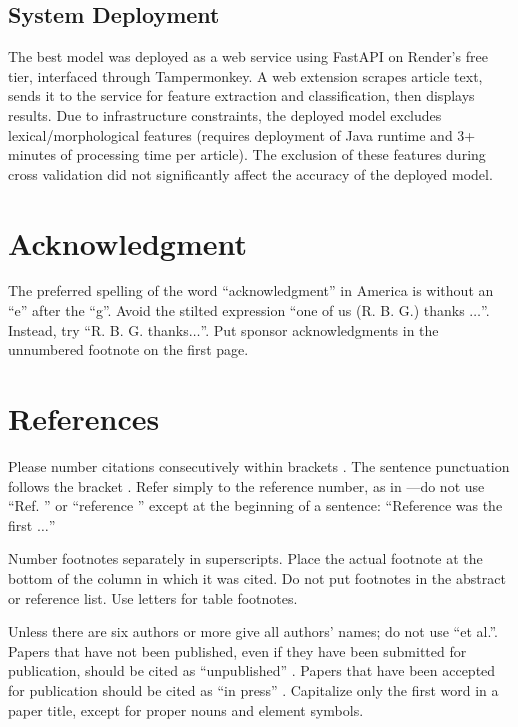 \documentclass[conference]{IEEEtran}
\begin{document}
\subsection{System Deployment}
The best model was deployed as a web service using FastAPI on Render's free tier, interfaced through Tampermonkey. A web extension scrapes article text, sends it to the service for feature extraction and classification, then displays results. Due to infrastructure constraints, the deployed model excludes lexical/morphological features (requires deployment of Java runtime and 3+ minutes of processing time per article). The exclusion of these features during cross validation did not significantly affect the accuracy of the deployed model.

\section*{Acknowledgment}

The preferred spelling of the word ``acknowledgment'' in America is without 
an ``e'' after the ``g''. Avoid the stilted expression ``one of us (R. B. 
G.) thanks $\ldots$''. Instead, try ``R. B. G. thanks$\ldots$''. Put sponsor 
acknowledgments in the unnumbered footnote on the first page.

\section*{References}

Please number citations consecutively within brackets \cite{b1}. The 
sentence punctuation follows the bracket \cite{b2}. Refer simply to the reference 
number, as in \cite{b3}---do not use ``Ref. \cite{b3}'' or ``reference \cite{b3}'' except at 
the beginning of a sentence: ``Reference \cite{b3} was the first $\ldots$''

Number footnotes separately in superscripts. Place the actual footnote at 
the bottom of the column in which it was cited. Do not put footnotes in the 
abstract or reference list. Use letters for table footnotes.

Unless there are six authors or more give all authors' names; do not use 
``et al.''. Papers that have not been published, even if they have been 
submitted for publication, should be cited as ``unpublished'' \cite{b4}. Papers 
that have been accepted for publication should be cited as ``in press'' \cite{b5}. 
Capitalize only the first word in a paper title, except for proper nouns and 
element symbols.
\end{document}
